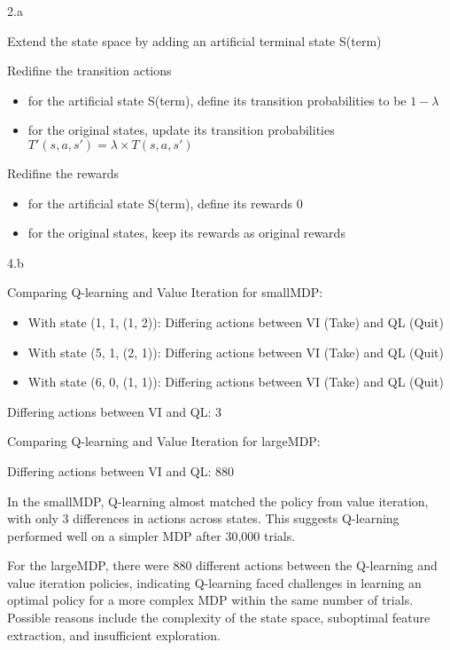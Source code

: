 \LARGE
2.a
\normalsize

\begin{answer}
  Extend the state space by adding an artificial terminal state S(term)

  Redifine the transition actions
  \begin{itemize}
    \item for the artificial state S(term), define its transition probabilities to be $1-\lambda$ 
    \item for the original states, update its transition probabilities $T'(s,a,s')=\lambda\times T(s,a,s')$
  \end{itemize}

  Redifine the rewards
  \begin{itemize}
    \item for the artificial state S(term), define its rewards $0$ 
    \item for the original states, keep its rewards as original rewards
  \end{itemize}
\end{answer}
\clearpage

\LARGE
4.b
\normalsize

\begin{answer}
  Comparing Q-learning and Value Iteration for smallMDP:

  \begin{itemize}
    \item With state (1, 1, (1, 2)): Differing actions between VI (Take) and QL (Quit)
    \item With state (5, 1, (2, 1)): Differing actions between VI (Take) and QL (Quit)
    \item With state (6, 0, (1, 1)): Differing actions between VI (Take) and QL (Quit)
  \end{itemize}

  Differing actions between VI and QL: 3


  Comparing Q-learning and Value Iteration for largeMDP:

  Differing actions between VI and QL: 880

  In the smallMDP, Q-learning almost matched the policy from value iteration, with only 3 differences in actions across states. This suggests Q-learning performed well on a simpler MDP after 30,000 trials.

  For the largeMDP, there were 880 different actions between the Q-learning and value iteration policies, indicating Q-learning faced challenges in learning an optimal policy for a more complex MDP within the same number of trials. Possible reasons include the complexity of the state space, suboptimal feature extraction, and insufficient exploration.
\end{answer}
\clearpage

